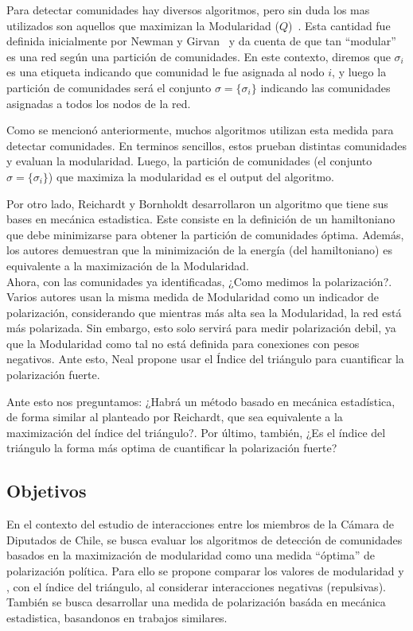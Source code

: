 \documentclass{proyectotesis}
\begin{document}
Para detectar comunidades hay diversos algoritmos, pero sin duda los mas utilizados son aquellos que maximizan la Modularidad ($Q$)~\cite{Newman_2004, Clauset_2004, Duch_2005, Blondel_2008, Arab_2012, Chen_2014}. Esta cantidad fue definida inicialmente por Newman y Girvan~\cite{NewmanGirvan2004} y da cuenta de que tan ``modular'' es una red según una partición de comunidades. En este contexto, diremos que $\sigma_i$ es una etiqueta indicando que comunidad le fue asignada al nodo $i$, y luego la partición de comunidades será el conjunto $\sigma = \{\sigma_i\}$ indicando las comunidades asignadas a todos los nodos de la red.

Como se mencionó anteriormente, muchos algoritmos utilizan esta medida para detectar comunidades. En terminos sencillos, estos prueban distintas comunidades y evaluan la modularidad. Luego, la partición de comunidades (el conjunto $\sigma = \{\sigma_i\}$) que maximiza la modularidad es el output del algoritmo.


Por otro lado, Reichardt y Bornholdt desarrollaron un algoritmo que tiene sus bases en mecánica estadistica. Este consiste en la definición de un hamiltoniano que debe minimizarse para obtener la partición de comunidades óptima. Además, los autores demuestran que la minimización de la energía (del hamiltoniano) es equivalente a la maximización de la Modularidad.\\

Ahora, con las comunidades ya identificadas, ¿Como medimos la polarización?. Varios autores usan la misma medida de Modularidad como un indicador de polarización, considerando que mientras más alta sea la Modularidad, la red está más polarizada. Sin embargo, esto solo servirá para medir polarización debil, ya que la Modularidad como tal no está definida para conexiones con pesos negativos. Ante esto, Neal propone usar el Índice del triángulo para cuantificar la polarización fuerte. 

Ante esto nos preguntamos: ¿Habrá un método basado en mecánica estadística, de forma similar al planteado por Reichardt, que sea equivalente a la maximización del índice del triángulo?. Por último, también, ¿Es el índice del triángulo la forma más optima de cuantificar la polarización fuerte?

\subsection{Objetivos}

En el contexto del estudio de interacciones entre los miembros de la Cámara de Diputados de Chile, se busca evaluar los algoritmos de detección de comunidades basados en la maximización de modularidad como una medida ``óptima'' de polarización política. Para ello se propone comparar los valores de modularidad y , con el índice del triángulo, al considerar interacciones negativas (repulsivas). 
También se busca desarrollar una medida de polarización basáda en mecánica estadistica, basandonos en trabajos similares.
\end{document}
